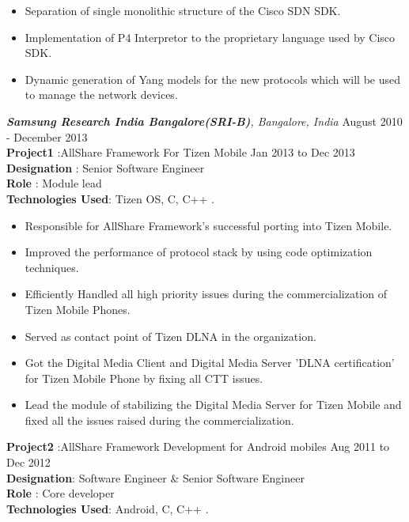 \documentclass{resumeclass}
\begin{document}
\begin{resume}
 \begin{itemize} \itemsep -2pt
  \item  Separation of single monolithic structure of the Cisco SDN SDK.
  \item Implementation of P4 Interpretor to the proprietary language used by Cisco SDK.
  \item Dynamic generation of Yang models for the new protocols which will be used to manage the network devices.
\end{itemize} \vspace{-6pt}

{\sl \textbf{Samsung Research India Bangalore(SRI-B)}, Bangalore, India} \hfill        August 2010 - December 2013 \\[0.5pt]

\textbf{Project1} :AllShare Framework For Tizen Mobile \hfill      Jan 2013 to Dec 2013 \\
\textbf{Designation} : Senior Software Engineer \\
\textbf{Role} : Module lead \\
\textbf{Technologies Used}: Tizen OS, C, C++ .

 \begin{itemize} \itemsep -2pt
  \item  Responsible for AllShare Framework's successful porting into Tizen Mobile.
  \item  Improved the performance of protocol stack by using code optimization techniques.
    \item  Efficiently Handled all high priority issues during the commercialization of Tizen Mobile Phones.
    \item Served as contact point of Tizen DLNA in the organization.
  \item Got the Digital Media Client and Digital Media Server 'DLNA certification' for Tizen Mobile Phone by fixing all CTT issues.
  \item Lead the module of stabilizing the Digital Media Server for Tizen Mobile and fixed all the issues raised during the commercialization.
\end{itemize} \vspace{-6pt}

\textbf{Project2} :AllShare Framework Development for Android mobiles \hfill      Aug 2011 to Dec 2012 \\
\textbf{Designation}: Software Engineer \& Senior Software Engineer\\
\textbf{Role} : Core developer\\
\textbf{Technologies Used}: Android, C, C++ .


\end{resume}
\end{document}
